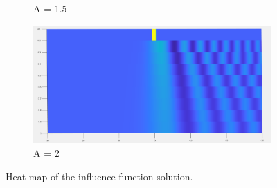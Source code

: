 \documentclass{article}
\begin{document}
\begin{figure}[H]
\begin{subfigure}[b]{60mm}
\caption{A = 1.5}
\label{fig:}
\end{subfigure}
\begin{subfigure}[b]{60mm}
\includegraphics[scale=0.1]{figures/infl2H.png}
\caption{A = 2}
\label{fig:}
\end{subfigure}

\caption{Heat map of the influence function solution.}
\label{fig:}
\end{figure}
\end{document}

